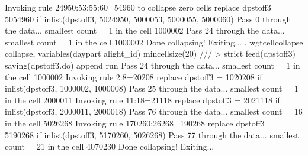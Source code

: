   Invoking rule 24950:53:55:60=54960 to collapse zero cells
  replace dpstoff3 = 5054960 if inlist(dpstoff3, 5024950, 5000053, 5000055, 5000060)
Pass 0 through the data...
  smallest count = 1 in the cell      1000002
Pass 24 through the data...
  smallest count = 1 in the cell      1000002
  Done collapsing! Exiting...
{\smallskip}
. wgtcellcollapse collapse, variables(daypart alight_id) mincellsize(20) ///
>         strict feed(dpstoff3) saving(dpstoff3.do) append run
Pass 24 through the data...
  smallest count = 1 in the cell      1000002
  Invoking rule 2:8=20208
  replace dpstoff3 = 1020208 if inlist(dpstoff3, 1000002, 1000008)
Pass 25 through the data...
  smallest count = 1 in the cell      2000011
  Invoking rule 11:18=21118
  replace dpstoff3 = 2021118 if inlist(dpstoff3, 2000011, 2000018)
\smallskip
\oom
\smallskip
Pass 76 through the data...
  smallest count = 16 in the cell      5026268
  Invoking rule 170260:26268=190268
  replace dpstoff3 = 5190268 if inlist(dpstoff3, 5170260, 5026268)
Pass 77 through the data...
  smallest count = 21 in the cell      4070230
  Done collapsing! Exiting...
